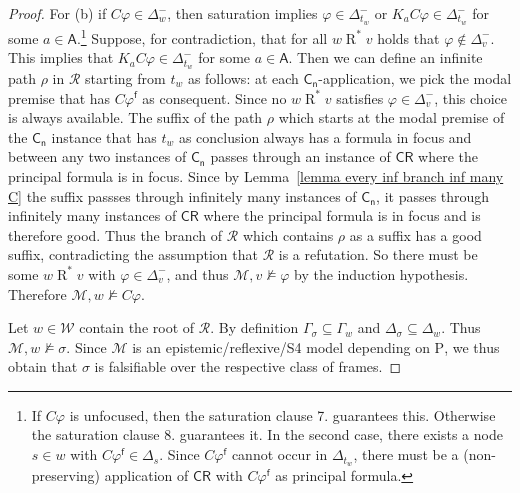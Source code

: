 \documentclass{myifcolog}
\newcommand\C {C}
\newcommand{\K}{K}
\newcommand\A{\mathsf{A}}
\newcommand{\agi}{a}
\newcommand{\fw}{\mathcal{M}}
\newcommand{\Rel}{\mathrel{R}}
\newcommand{\f}{\mathsf{f}}
\newcommand{\W}{\mathcal{W}}
\newcommand{\hickp}{\mathrm{P}}
\numberwithin{theorem}{section}
\begin{document}
\begin{proof}
For (b) if $\C\varphi\in \Delta^-_w$, then saturation implies $\varphi\in \Delta^-_{t_w}$ or $\K_\agi\C\varphi\in \Delta^-_{t_w}$ for some $\agi \in \A$.\footnote{If $\C \varphi$ is unfocused, then the saturation clause 7. guarantees this. Otherwise the saturation clause 8. guarantees it. In the second case, there exists a node $s \in w$ with $\C \varphi^\f \in \Delta_s$. Since $\C \varphi^\f$ cannot occur in $\Delta_{t_w}$, there must be a (non-preserving) application of $\mathsf{\C R}$ with $\C \varphi^\f$ as principal formula.} Suppose, for contradiction, that for all $w \Rel^* v$ holds that $\varphi \not \in \Delta^-_v$. This implies that $\K_\agi \C \varphi \in \Delta_{t_w}^-$ for some $\agi \in \A$. Then we can define an infinite path $\rho$ in $\mathscr{R}$ starting from $t_w$ as follows: at each $\mathsf{C_n}$-application, we pick the modal premise that has $\C\varphi^\f$ as consequent. Since no $w \Rel^* v$ satisfies $\varphi\in \Delta^-_v$, this choice is always available. The suffix of the path $\rho$ which starts at the modal premise of the $\mathsf{C_n}$ instance that has $t_w$ as conclusion always has a formula in focus and between any two instances of $\mathsf{C_n}$ passes through an instance of $\mathsf{C \mathsf{R}}$ where the principal formula is in focus. Since by Lemma~\ref{lemma every inf branch inf many C} the suffix passses through infinitely many instances of $\mathsf{C_n}$, it passes through infinitely many instances of $\mathsf{C \mathsf{R}}$ where the principal formula is in focus and is therefore good. Thus the branch of $\mathscr{R}$ which contains $\rho$ as a suffix has a good suffix, contradicting the assumption that $\mathscr{R}$ is a refutation. So there must be some $w \Rel^* v$ with $\varphi\in \Delta^-_v$, and thus $\fw,v\not\models \varphi$ by the induction hypothesis. Therefore $\fw,w\not\models \C\varphi$.


Let $w \in \W$ contain the root of $\mathscr{R}$. By definition $\Gamma_\sigma \subseteq \Gamma_w$ and $\Delta_\sigma \subseteq \Delta_w$. Thus  $\fw,w \not \models \sigma$. Since $\fw$ is an epistemic/reflexive/S4 model depending on $\hickp$, we thus obtain that $\sigma$ is falsifiable over the respective class of frames.
\end{proof}
\end{document}
